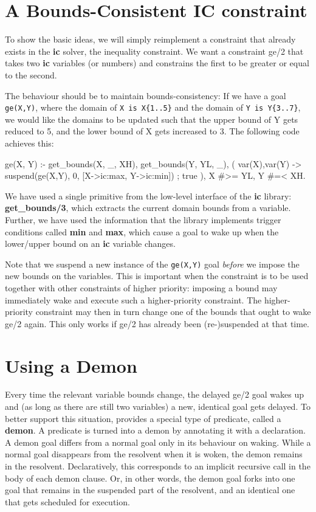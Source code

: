 \section{A Bounds-Consistent IC constraint}

To show the basic ideas, we will simply reimplement a constraint that
already exists in the {\bf ic} solver, the inequality constraint.
We want a constraint ge/2 that takes two {\bf ic} variables (or numbers)
and constrains the first to be greater or equal to the second.

The behaviour should be to maintain bounds-consistency:
If we have a goal {\tt ge(X,Y)}, where the domain of \verb/X is X{1..5}/ and
the domain of \verb/Y is Y{3..7}/, we would like the domains to be updated such
that the upper bound of Y gets reduced to 5, and the lower bound of X
gets increased to 3. The following code achieves this:
\begin{code}
ge(X, Y) :-
        get_bounds(X, _, XH),
        get_bounds(Y, YL, _),
        ( var(X),var(Y) ->
            suspend(ge(X,Y), 0, [X->ic:max, Y->ic:min])
        ;
            true
        ),
        X #>= YL,    %
        Y #=< XH.
\end{code}
We have used a single primitive from the low-level interface of the
{\bf ic} library:  {\bf get_bounds/3}, which extracts the current
domain bounds from a variable.  Further, we have used the information
that the library implements trigger conditions called {\bf min}
and {\bf max}, which cause a goal to wake up when the lower/upper
bound on an {\bf ic} variable changes.

Note that we suspend a new instance of the {\tt ge(X,Y)} goal {\em before}
we impose the new bounds on the variables. This is important when the
constraint is to be used together with other constraints of higher
priority: imposing a bound may immediately wake and execute such
a higher-priority constraint. The higher-priority constraint may then
in turn change one of the bounds that ought to wake ge/2 again.
This only works if ge/2 has already been (re-)suspended at that time.


\section{Using a Demon}
Every time the relevant variable bounds change, the delayed ge/2 goal
wakes up and (as long as there are still two variables) a new,
identical goal gets delayed.
To better support this situation, {\eclipse} provides a special type
of predicate, called a {\bf demon}.
A predicate is turned into a
demon by annotating it with a
declaration.
A demon goal differs from a normal goal only in its behaviour on
waking. While a normal goal disappears from the resolvent when it is
woken, the demon remains in the resolvent.
Declaratively, this corresponds to an implicit recursive call in
the body of each demon clause.
Or, in other words, the demon goal forks into one goal that remains in the
suspended part of the resolvent, and an identical one
that gets scheduled for execution.

